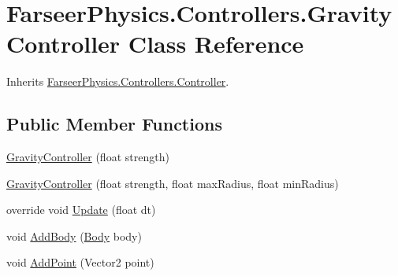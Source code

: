 \hypertarget{class_farseer_physics_1_1_controllers_1_1_gravity_controller}{\section{Farseer\+Physics.\+Controllers.\+Gravity\+Controller Class Reference}
\label{class_farseer_physics_1_1_controllers_1_1_gravity_controller}
}


Inherits \hyperlink{class_farseer_physics_1_1_controllers_1_1_controller}{Farseer\+Physics.\+Controllers.\+Controller}.

\subsection*{Public Member Functions}
\begin{DoxyCompactItemize}
\item 
\hyperlink{class_farseer_physics_1_1_controllers_1_1_gravity_controller_a764cc3cc9b3a0a37be8f37b4331c27e7}{Gravity\+Controller} (float strength)
\item 
\hyperlink{class_farseer_physics_1_1_controllers_1_1_gravity_controller_a285090c5febd00bf072c8ca71d302fbc}{Gravity\+Controller} (float strength, float max\+Radius, float min\+Radius)
\item 
override void \hyperlink{class_farseer_physics_1_1_controllers_1_1_gravity_controller_ac62378cc8f360e572b15f543def3d3ea}{Update} (float dt)
\item 
void \hyperlink{class_farseer_physics_1_1_controllers_1_1_gravity_controller_a0fc0e3d5df0c345812673a5e137441cc}{Add\+Body} (\hyperlink{class_farseer_physics_1_1_dynamics_1_1_body}{Body} body)
\item 
void \hyperlink{class_farseer_physics_1_1_controllers_1_1_gravity_controller_acd4253edf8224d8c7f6db5477810520a}{Add\+Point} (Vector2 point)
\end{DoxyCompactItemize}
